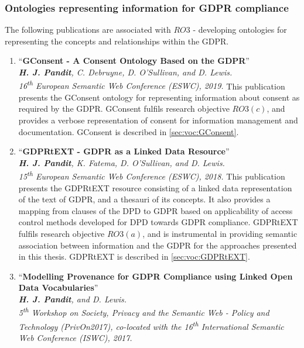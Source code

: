 \subsubsection{Ontologies representing information for GDPR compliance}
The following publications are associated with $RO3$ - developing ontologies for representing the concepts and relationships within the GDPR.
\begin{enumerate}[start]
    \item ``\textbf{GConsent - A Consent Ontology Based on the GDPR}'' \cite{pandit_gconsent_2019} \\
    \textit{\textbf{H. J. Pandit}, C. Debruyne, D. O’Sullivan, and D. Lewis.} \\ 
    \textit{16\textsuperscript{th} European Semantic Web Conference (ESWC), 2019.}
        \vspace{0.1cm} \newline
        This publication presents the GConsent ontology for representing information about consent as required by the GDPR. GConsent fulfils research objective $RO3(c)$, and provides a verbose representation of consent for information management and documentation. GConsent is described in \autoref{sec:voc:GConsent}.
    \item ``\textbf{GDPRtEXT - GDPR as a Linked Data Resource}'' \cite{pandit_gdprtext_2018} \\
    \textit{\textbf{H. J. Pandit}, K. Fatema, D. O’Sullivan, and D. Lewis.} \\
    \textit{15\textsuperscript{th} European Semantic Web Conference (ESWC), 2018.}
        \vspace{0.1cm} \newline
        This publication presents the GDPRtEXT resource consisting of a linked data representation of the text of GDPR, and a thesauri of its concepts. It also provides a mapping from clauses of the DPD to GDPR based on applicability of access control methods developed for DPD towards GDPR compliance. GDPRtEXT fulfils research objective $RO3(a)$, and is instrumental in providing semantic association between information and the GDPR for the approaches presented in this thesis. GDPRtEXT is described in \autoref{sec:voc:GDPRtEXT}.
    \item ``\textbf{Modelling Provenance for GDPR Compliance using Linked Open Data Vocabularies}'' \cite{pandit_modelling_2017} \\ 
    \textit{\textbf{H. J. Pandit}, and D. Lewis.} \\
    \textit{5\textsuperscript{th} Workshop on Society, Privacy and the Semantic Web - Policy and Technology (PrivOn2017), co-located with the 16\textsuperscript{th} International Semantic Web Conference (ISWC), 2017. }

\end{enumerate}
